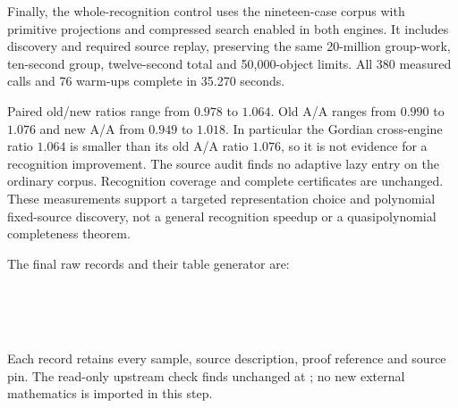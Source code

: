 Finally, the whole-recognition control uses the nineteen-case corpus with
primitive projections and compressed search enabled in both engines. It
includes discovery and required source replay, preserving the same
20-million group-work, ten-second group, twelve-second total and 50,000-object
limits. All 380 measured calls and 76 warm-ups complete in 35.270 seconds.



Paired old/new ratios range from $0.978$ to $1.064$. Old A/A ranges from
$0.990$ to $1.076$ and new A/A from $0.949$ to $1.018$. In particular the
Gordian cross-engine ratio $1.064$ is smaller than its old A/A ratio $1.076$,
so it is not evidence for a recognition improvement. The source audit finds
no adaptive lazy entry on the ordinary corpus. Recognition coverage and
complete certificates are unchanged. These measurements support a targeted
representation choice and polynomial fixed-source discovery, not a general
recognition speedup or a quasipolynomial completeness theorem.

The final raw records and their table generator are:
\begin{flushleft}\small
{}\\
\\
\\
\end{flushleft}
Each record retains every sample, source description, proof reference and
source pin. The read-only upstream
check finds  unchanged at ; no new external
mathematics is imported in this step.
